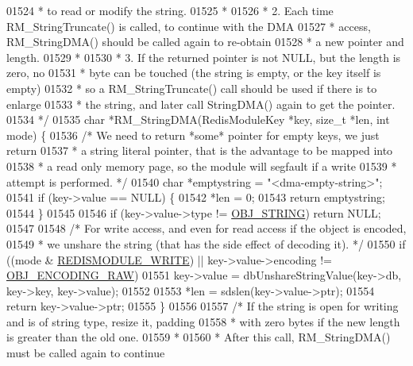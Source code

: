 \begin{DoxyCode}
{{{01524 \textcolor{comment}{ * to read or modify the string.}
01525 \textcolor{comment}{ *}
01526 \textcolor{comment}{ * 2. Each time RM\_StringTruncate() is called, to continue with the DMA}
01527 \textcolor{comment}{ * access, RM\_StringDMA() should be called again to re-obtain}
01528 \textcolor{comment}{ * a new pointer and length.}
01529 \textcolor{comment}{ *}
01530 \textcolor{comment}{ * 3. If the returned pointer is not NULL, but the length is zero, no}
01531 \textcolor{comment}{ * byte can be touched (the string is empty, or the key itself is empty)}
01532 \textcolor{comment}{ * so a RM\_StringTruncate() call should be used if there is to enlarge}
01533 \textcolor{comment}{ * the string, and later call StringDMA() again to get the pointer.}
01534 \textcolor{comment}{ */}
01535 \textcolor{keywordtype}{char} *RM\_StringDMA(RedisModuleKey *key, size\_t *len, \textcolor{keywordtype}{int} mode) \{
01536     \textcolor{comment}{/* We need to return *some* pointer for empty keys, we just return}
01537 \textcolor{comment}{     * a string literal pointer, that is the advantage to be mapped into}
01538 \textcolor{comment}{     * a read only memory page, so the module will segfault if a write}
01539 \textcolor{comment}{     * attempt is performed. */}
01540     \textcolor{keywordtype}{char} *emptystring = \textcolor{stringliteral}{"<dma-empty-string>"};
01541     \textcolor{keywordflow}{if} (key->value == NULL) \{
01542         *len = 0;
01543         \textcolor{keywordflow}{return} emptystring;
01544     \}
01545 
01546     \textcolor{keywordflow}{if} (key->value->type != \hyperlink{server_8h_a65236ea160f69cdef33ec942092af88f}{OBJ\_STRING}) \textcolor{keywordflow}{return} NULL;
01547 
01548     \textcolor{comment}{/* For write access, and even for read access if the object is encoded,}
01549 \textcolor{comment}{     * we unshare the string (that has the side effect of decoding it). */}
01550     \textcolor{keywordflow}{if} ((mode & \hyperlink{redismodule_8h_a73b37117ef94cb4a904361afcc51b6b4}{REDISMODULE\_WRITE}) || key->value->encoding != 
      \hyperlink{server_8h_a148bc85e3074e324a6dc5eebcad1bcd5}{OBJ\_ENCODING\_RAW})
01551         key->value = dbUnshareStringValue(key->db, key->key, key->value);
01552 
01553     *len = sdslen(key->value->ptr);
01554     \textcolor{keywordflow}{return} key->value->ptr;
01555 \}
01556 
01557 \textcolor{comment}{/* If the string is open for writing and is of string type, resize it, padding}
01558 \textcolor{comment}{ * with zero bytes if the new length is greater than the old one.}
01559 \textcolor{comment}{ *}
01560 \textcolor{comment}{ * After this call, RM\_StringDMA() must be called again to continue}
}}}
\end{DoxyCode}
